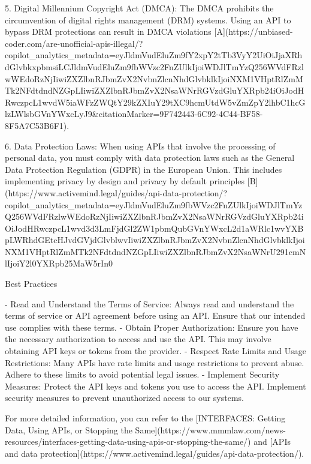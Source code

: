 \documentclass[12pt,letterpaper]{article}
\begin{document}
5. Digital Millennium Copyright Act (DMCA): The DMCA prohibits the circumvention of digital rights management (DRM) systems. Using an API to bypass DRM protections can result in DMCA violations [A](https://unbiased-coder.com/are-unofficial-apis-illegal/?copilot_analytics_metadata=eyJldmVudEluZm9fY2xpY2tTb3VyY2UiOiJjaXRhdGlvbkxpbmsiLCJldmVudEluZm9fbWVzc2FnZUlkIjoiWDJlTmYzQ256WVdFRzlwWEdoRzNjIiwiZXZlbnRJbmZvX2NvbnZlcnNhdGlvbklkIjoiNXM1VHptRlZmMTk2NFdtdndNZGpLIiwiZXZlbnRJbmZvX2NsaWNrRGVzdGluYXRpb24iOiJodHRwczpcL1wvdW5iaWFzZWQtY29kZXIuY29tXC9hcmUtdW5vZmZpY2lhbC1hcGlzLWlsbGVnYWxcLyJ9&citationMarker=9F742443-6C92-4C44-BF58-8F5A7C53B6F1).

6. Data Protection Laws: When using APIs that involve the processing of personal data, you must comply with data protection laws such as the General Data Protection Regulation (GDPR) in the European Union. This includes implementing privacy by design and privacy by default principles [B](https://www.activemind.legal/guides/api-data-protection/?copilot_analytics_metadata=eyJldmVudEluZm9fbWVzc2FnZUlkIjoiWDJlTmYzQ256WVdFRzlwWEdoRzNjIiwiZXZlbnRJbmZvX2NsaWNrRGVzdGluYXRpb24iOiJodHRwczpcL1wvd3d3LmFjdGl2ZW1pbmQubGVnYWxcL2d1aWRlc1wvYXBpLWRhdGEtcHJvdGVjdGlvblwvIiwiZXZlbnRJbmZvX2NvbnZlcnNhdGlvbklkIjoiNXM1VHptRlZmMTk2NFdtdndNZGpLIiwiZXZlbnRJbmZvX2NsaWNrU291cmNlIjoiY2l0YXRpb25MaW5rIn0%

 				Best Practices

- Read and Understand the Terms of Service: Always read and understand the terms of service or API agreement before using an API. Ensure that our intended use complies with these terms.
- Obtain Proper Authorization: Ensure you have the necessary authorization to access and use the API. This may involve obtaining API keys or tokens from the provider.
- Respect Rate Limits and Usage Restrictions: Many APIs have rate limits and usage restrictions to prevent abuse. Adhere to these limits to avoid potential legal issues.
- Implement Security Measures: Protect the API keys and tokens you use to access the API. Implement security measures to prevent unauthorized access to our systems.

For more detailed information, you can refer to the [INTERFACES: Getting Data, Using APIs, or Stopping the Same](https://www.mmmlaw.com/news-resources/interfaces-getting-data-using-apis-or-stopping-the-same/) and [APIs and data protection](https://www.activemind.legal/guides/api-data-protection/).

 
\end{document}
